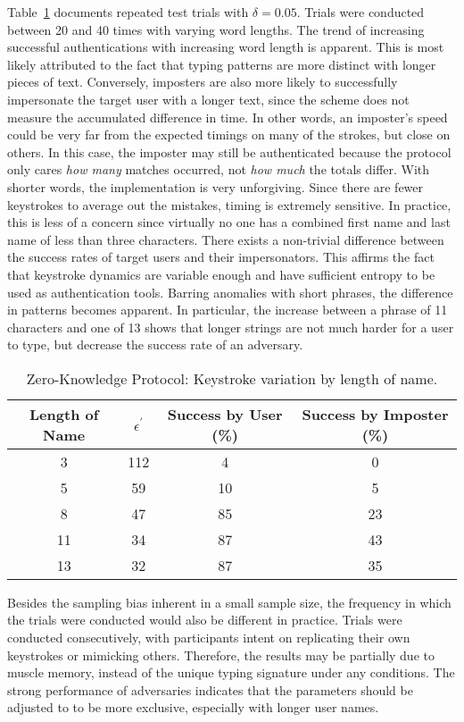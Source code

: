 \documentclass[11pt]{article}
\begin{document}
Table~\ref{table:res-zkp} documents repeated test trials with $\delta=0.05$. Trials were conducted between 20 and 40 times with varying word lengths. The trend of increasing successful authentications with increasing word length is apparent. This is most likely attributed to the fact that typing patterns are more distinct with longer pieces of text. Conversely, imposters are also more likely to successfully impersonate the target user with a longer text, since the scheme does not measure the accumulated difference in time. In other words, an imposter's speed could be very far from the expected timings on many of the strokes, but close on others. In this case, the imposter may still be authenticated because the protocol only cares \textit{how many} matches occurred, not \textit{how much} the totals differ. With shorter words, the implementation is very unforgiving.  Since there are fewer keystrokes to average out the mistakes, timing is extremely sensitive.  In practice, this is less of a concern since virtually no one has a combined first name and last name of less than three characters. There exists a non-trivial difference between the success rates of target users and their impersonators. This affirms the fact that keystroke dynamics are variable enough and have sufficient entropy to be used as authentication tools. Barring anomalies with short phrases, the difference in patterns becomes apparent. In particular, the increase between a phrase of 11 characters and one of 13 shows that longer strings are not much harder for a user to type, but decrease the success rate of an adversary.

\begin{table}[h!]
\centering
\begin{tabular}{|c c c c|}
 \hline
 Length of Name & $\epsilon^{'}$ & Success by User (\%) & Success by Imposter (\%) \\ [0.5ex] 
 \hline\hline
 3 & 112 & 4 & 0 \\ 
 5 & 59 & 10 & 5 \\
 8 & 47 & 85 & 23 \\ 
 11 & 34 & 87 & 43 \\
 13 & 32 & 87 & 35 \\ [1ex] 
 \hline
\end{tabular}
\caption{Zero-Knowledge Protocol: Keystroke variation by length of name.}
\label{table:res-zkp}
\end{table}

Besides the sampling bias inherent in a small sample size, the frequency in which the trials were conducted would also be different in practice. Trials were conducted consecutively, with participants intent on replicating their own keystrokes or mimicking others. Therefore, the results may be partially due to muscle memory, instead of the unique typing signature under any conditions. The strong performance of adversaries indicates that the parameters should be adjusted to to be more exclusive, especially with longer user names.
\end{document}
